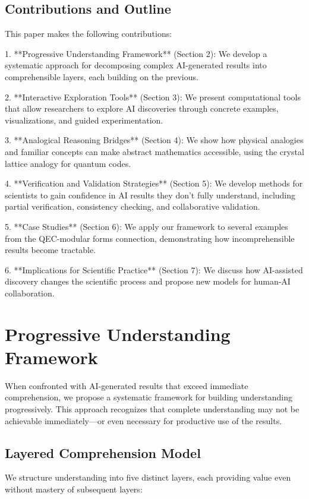 \documentclass[11pt,a4paper]{article}
\begin{document}
\subsection{Contributions and Outline}

This paper makes the following contributions:

1. **Progressive Understanding Framework** (Section 2): We develop a systematic approach for decomposing complex AI-generated results into comprehensible layers, each building on the previous.

2. **Interactive Exploration Tools** (Section 3): We present computational tools that allow researchers to explore AI discoveries through concrete examples, visualizations, and guided experimentation.

3. **Analogical Reasoning Bridges** (Section 4): We show how physical analogies and familiar concepts can make abstract mathematics accessible, using the crystal lattice analogy for quantum codes.

4. **Verification and Validation Strategies** (Section 5): We develop methods for scientists to gain confidence in AI results they don't fully understand, including partial verification, consistency checking, and collaborative validation.

5. **Case Studies** (Section 6): We apply our framework to several examples from the QEC-modular forms connection, demonstrating how incomprehensible results become tractable.

6. **Implications for Scientific Practice** (Section 7): We discuss how AI-assisted discovery changes the scientific process and propose new models for human-AI collaboration.

\section{Progressive Understanding Framework}

When confronted with AI-generated results that exceed immediate comprehension, we propose a systematic framework for building understanding progressively. This approach recognizes that complete understanding may not be achievable immediately—or even necessary for productive use of the results.

\subsection{Layered Comprehension Model}

We structure understanding into five distinct layers, each providing value even without mastery of subsequent layers:
\end{document}
